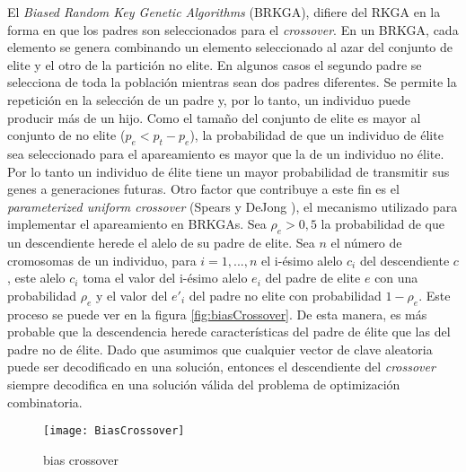 El \textit{Biased Random Key Genetic Algorithms} (BRKGA), difiere del RKGA en la forma en que los padres son seleccionados para el \textit{crossover}. En un BRKGA, cada elemento se genera combinando un elemento seleccionado al azar del conjunto de elite y el otro de la partición no elite. En algunos casos el segundo padre se selecciona de toda la población mientras sean dos padres diferentes. Se permite la repetición en la selección de un padre y, por lo tanto, un individuo puede producir más de un hijo. Como el tamaño del conjunto de elite es mayor al conjunto de no elite ($p_e < p_t - p_e$), la probabilidad de que un individuo de élite sea seleccionado para el apareamiento es mayor que la de un individuo no élite. Por lo tanto un individuo de élite tiene un mayor probabilidad de transmitir sus genes a generaciones futuras. Otro factor que contribuye a este fin es el \textit{parameterized uniform crossover} (Spears y DeJong \cite{SpearsDeJong}), el mecanismo utilizado para implementar el apareamiento en BRKGAs. Sea $\rho_e > 0,5$ la probabilidad de que un descendiente herede el alelo de su padre de elite. Sea $n$ el número de cromosomas de un individuo, para $i =1,...,n$ el i-ésimo alelo $c_i$ del descendiente $c$, este alelo $c_i$ toma el valor del i-ésimo alelo $e_i$ del padre de elite $e$ con una probabilidad $\rho_e$ y el valor del $e'_i$ del padre no elite con probabilidad $1-\rho_e$. Este proceso se puede ver en la figura \ref{fig:biasCrossover}. De esta manera, es más probable que la descendencia herede características del padre de élite que las del padre no de élite. Dado que asumimos que cualquier vector de clave aleatoria puede ser decodificado en una solución, entonces el descendiente del \textit{crossover} siempre decodifica en una solución válida del problema de optimización combinatoria.



\begin{figure}[h]
	\caption{bias crossover}
	\centering
	\texttt{[image: BiasCrossover]}
	\label{fig:biascrossover}
\end{figure}

